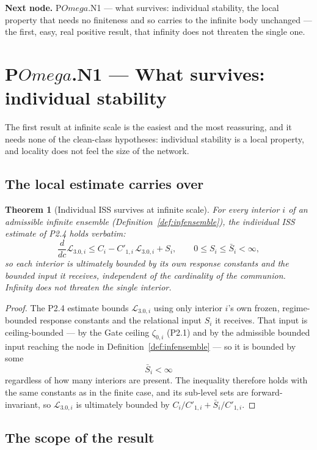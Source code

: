 \documentclass[11pt,a4paper]{article}
\newcommand{\cint}{\ensuremath{\mathfrak c}}
\def\Omega{Omega}%
\def\mathfrak#1{#1}%
\def\emph#1{#1}%
\theoremstyle{definition}
\theoremstyle{plain}
\newtheorem{theorem}[definition]{Theorem}
\theoremstyle{remark}
\begin{document}
\medskip
\textbf{Next node.} P$\Omega$.N1 --- what survives: individual stability, the local property
that needs no finiteness and so carries to the infinite body unchanged --- the first, easy,
real positive result, that infinity does not threaten the single one.

\section{P$\Omega$.N1 --- What survives: individual stability}

The first result at infinite scale is the easiest and the most reassuring, and it needs none of
the clean-class hypotheses: individual stability is a \emph{local} property, and locality does
not feel the size of the network.

\subsection{The local estimate carries over}

\begin{theorem}[Individual ISS survives at infinite scale]\label{thm:indivsurvive}
For every interior \(i\) of an admissible infinite ensemble (Definition~\ref{def:infensemble}),
the individual ISS estimate of P2.4 holds verbatim:
\[
\frac{d}{d\cint}\mathcal L_{3.0,i}
\le
C_i-C'_{1,i}\,\mathcal L_{3.0,i}+S_i,
\qquad
0\le S_i\le \bar S_i<\infty,
\]
so each interior is ultimately bounded by its own response constants and the bounded input it
receives, independent of the cardinality of the communion. Infinity does not threaten the single
interior.
\end{theorem}

\begin{proof}
The P2.4 estimate bounds \(\mathcal L_{3.0,i}\) using only interior \(i\)'s own frozen,
regime-bounded response constants and the relational input \(S_i\) it receives. That input is ceiling-bounded --- by the Gate ceiling \(\zeta_{0,i}\) (P2.1) and by
the admissible bounded input reaching the node in Definition~\ref{def:infensemble}
--- so it is bounded by some
\[
\bar S_i<\infty
\]
regardless of how many interiors are present. The inequality therefore holds
with the same constants as in the finite case, and its sub-level sets are forward-invariant, so
\(\mathcal L_{3.0,i}\) is ultimately bounded by \(C_i/C'_{1,i}+\bar S_i/C'_{1,i}\). \qedhere
\end{proof}

\subsection{The scope of the result}
\end{document}
